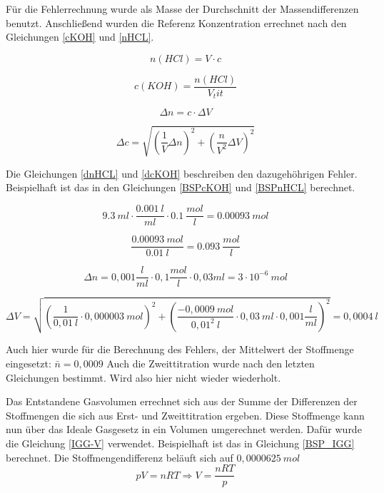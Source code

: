 Für die Fehlerrechnung wurde als Masse der Durchschnitt der Massendifferenzen benutzt.
Anschließend wurden die Referenz Konzentration errechnet nach den Gleichungen \ref{cKOH} und \ref{nHCL}.

\begin{equation}
n (HCl)= V \cdot c
\label{nHCL}
\end{equation}

\begin{equation}
c (KOH) = \frac{n(HCl)}{V_tit}
\label{cKOH}
\end{equation}

\begin{equation}
\Delta n=c\cdot \Delta V
\label{dnHCL}
\end{equation}

\begin{equation}
\Delta c= \sqrt{\left(\frac{1}{V}\Delta n\right)^2 + \left(\frac{n}{V^2}\Delta V\right)^2}
\label{dcKOH}
\end{equation}

Die Gleichungen \ref{dnHCL} und \ref{dcKOH} beschreiben den dazugehöhrigen Fehler.
Beispielhaft ist das in den Gleichungen \ref{BSPcKOH} und \ref{BSPnHCL} berechnet.

\begin{equation}
9.3\ ml \cdot \frac{0.001\ l}{ml} \cdot 0.1\ \frac{mol}{l} = 0.00093\ mol
\label{BSPnHCL}
\end{equation}

\begin{equation}
\frac{0.00093\ mol}{0.01\ l} = 0.093\ \frac{mol}{l}
\label{BSPcKOH}
\end{equation}

\begin{equation}
\Delta n=0,001\frac{l}{ml}\cdot0,1\frac{mol}{l}\cdot 0,03 ml = 3\cdot 10^{-6}\ mol
\label{BSPnHCL}
\end{equation}

\begin{equation}
\Delta V= \sqrt{\left(\frac{1}{0,01\ l}\cdot 0,000003\ mol\right)^2 + \left(\frac{-0,0009\ mol}{0,01^2\ l}\cdot0,03\ ml\cdot 0,001\frac{l}{ml}\right)^2}=0,0004\ l
\label{BSPcKOH}
\end{equation}

Auch hier wurde für die Berechnung des Fehlers, der Mittelwert der Stoffmenge eingesetzt: $\bar{n}=0,0009$
Auch die Zweittitration wurde nach den letzten Gleichungen bestimmt. Wird also hier nicht wieder wiederholt.

Das Entstandene Gasvolumen errechnet sich aus der Summe der Differenzen der Stoffmengen die sich aus Erst- und Zweittitration ergeben.
Diese Stoffmenge kann nun über das Ideale Gasgesetz in ein Volumen umgerechnet werden.
Dafür wurde die Gleichung \ref{IGG-V} verwendet. Beispielhaft ist das in Gleichung \ref{BSP_IGG} berechnet. Die Stoffmengendifferenz beläuft sich auf $0,0000625\ mol$
\begin{equation}
pV=nRT \Rightarrow V=\frac{nRT}{p}
\label{IGG-V}
\end{equation}

